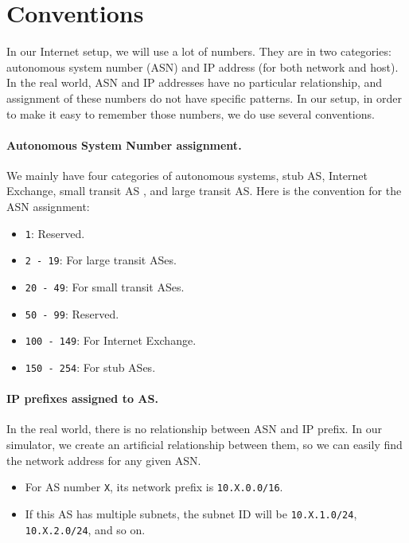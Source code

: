 \section{Conventions} 

In our Internet setup, we will use a lot of numbers. 
They are in two categories: autonomous system number (ASN)
and IP address (for both network and host).
In the real world, ASN and IP addresses have no particular
relationship, and assignment of these numbers do not 
have specific patterns. In our setup, 
in order to make it easy to remember those numbers,
we do use several conventions. 


\paragraph{Autonomous System Number assignment.}
We mainly have four categories of autonomous systems, 
stub AS, Internet Exchange, small transit AS , and large transit AS. Here is the 
convention for the ASN assignment:

\begin{itemize}[noitemsep]
\item \texttt{1}: Reserved.
\item \texttt{2  - 19}: For large transit ASes.
\item \texttt{20 - 49}: For small transit ASes.
\item \texttt{50 - 99}: Reserved.
\item \texttt{100 - 149}: For Internet Exchange.
\item \texttt{150 - 254}: For stub ASes.
\end{itemize}
 

\paragraph{IP prefixes assigned to AS.}
In the real world, there is no relationship between
ASN and IP prefix. In our simulator, we 
create an artificial relationship between them,
so we can easily find the network address 
for any given ASN.


\begin{itemize}[noitemsep]
\item For AS number \texttt{X}, its network prefix is \texttt{10.X.0.0/16}. 

\item If this AS has multiple subnets, the subnet  ID will be 
      \texttt{10.X.1.0/24}, \texttt{10.X.2.0/24}, and so on.
\end{itemize}



